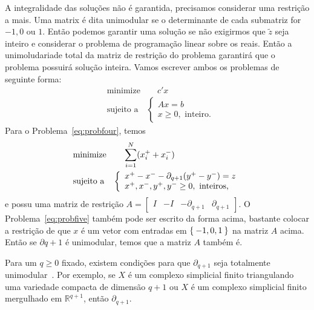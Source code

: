 A integralidade das soluções não é garantida, precisamos considerar uma
restrição a mais. Uma matrix é dita unimodular se o determinante de cada
submatriz for $-1, 0$ ou $1$. Então podemos garantir uma solução se 
não exigirmos que $\tilde{z}$ seja inteiro e considerar o problema 
de programação linear sobre os reais. Então a unimoludariade total
da matriz de restrição do problema garantirá que o problema possuirá 
solução inteira. Vamos escrever ambos os problemas de seguinte forma:
\begin{equation*}
    \begin{split}
        &\text{minimize} \quad \quad c'x \\
        &\text{sujeito a} \quad \left \{ \begin{array}{l}
            Ax = b \\
            x \geq 0, \text{ inteiro.}
        \end{array} \right.
    \end{split}
\end{equation*}
Para o Problema~\eqref{eq:probfour}, temos
\begin{equation*}
    \begin{split}
        &\text{minimize} \quad \quad  \sum_{i=1}^N (x^+_i + x^-_i) \\
        &\text{sujeito a} \quad \left \{ \begin{array}{l}
            x^+ - x^- - \partial_{q+1}(y^+ - y^-) = z \\
            x^+, x^-, y^+, y^-  \geq 0, \text{ inteiros,}
        \end{array} \right.
    \end{split}
\end{equation*}
e possu uma matriz de restrição 
$A = \begin{bmatrix}
I & -I & -\partial_{q+1} & \partial_{q+1}
\end{bmatrix}$. O Problema~\eqref{eq:probfive} também pode ser escrito da forma acima,
bastante colocar a restrição de que $x$ é um vetor com entradas em $\Set{-1,0,1}$ na 
matriz $A$ acima. Então se $\partial{q+1}$ é unimodular, temos que a matriz $A$
também é. 

Para um $q \geq 0$ fixado, existem condições para que $\partial_{q+1}$ seja 
totalmente unimodular~\cite{Dey2010}. Por exemplo, se $X$ é um complexo simplicial finito
triangulando uma variedade compacta de dimensão $q+1$ ou $X$ é um complexo simplicial
finito mergulhado em $\mathbb{R}^{q+1}$, então $\partial_{q+1}$.

